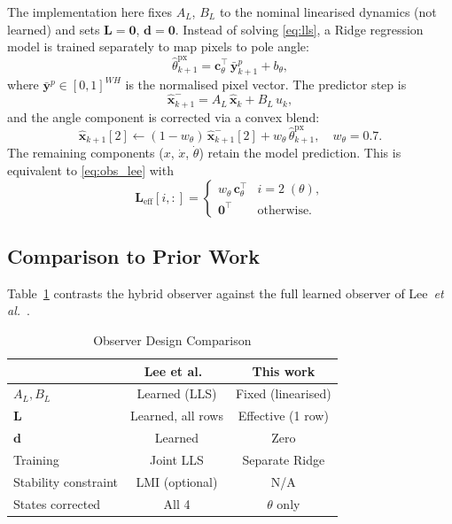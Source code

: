 \documentclass[conference]{IEEEtran}
\newcommand{\by}{\bm{y}}
\newcommand{\bxhat}{\hat{\bm{x}}}
\newcommand{\AL}{A_L}
\newcommand{\BL}{B_L}
\newcommand{\Lmat}{\bm{L}}
\begin{document}
The implementation here fixes $\AL$, $\BL$ to the nominal linearised dynamics
(not learned) and sets $\Lmat=\bm{0}$, $\bm{d}=\bm{0}$.  Instead of
solving \eqref{eq:lls}, a Ridge regression model is trained separately to map
pixels to pole angle:
\begin{equation}
  \hat\theta^{\mathrm{px}}_{k+1}
  = \bm{c}_\theta^\top\,\bar{\by}^p_{k+1} + b_\theta,
  \label{eq:ridge}
\end{equation}
where $\bar{\by}^p\in[0,1]^{WH}$ is the normalised pixel vector.  The
predictor step is
\begin{equation}
  \bxhat^-_{k+1} = \AL\,\bxhat_k + \BL\,u_k,
  \label{eq:predict}
\end{equation}
and the angle component is corrected via a convex blend:
\begin{equation}
  \bxhat_{k+1}[2] \leftarrow
  (1-w_\theta)\,\bxhat^-_{k+1}[2]
  + w_\theta\,\hat\theta^{\mathrm{px}}_{k+1},
  \quad w_\theta = 0.7.
  \label{eq:blend}
\end{equation}
The remaining components ($x$, $\dot x$, $\dot\theta$) retain the model
prediction.  This is equivalent to \eqref{eq:obs_lee} with
\begin{equation}
  \Lmat_{\mathrm{eff}}[i,:] = \begin{cases}
    w_\theta\,\bm{c}_\theta^\top & i=2\;(\theta), \\
    \bm{0}^\top & \text{otherwise.}
  \end{cases}
  \label{eq:Leff}
\end{equation}

\subsection{Comparison to Prior Work}

Table~\ref{tab:compare} contrasts the hybrid observer against the full
learned observer of Lee~\emph{et al.}~\cite{lee2024}.

\begin{table}[t]
  \centering
  \caption{Observer Design Comparison}
  \label{tab:compare}
  \renewcommand{\arraystretch}{1.15}
  \begin{tabular}{lcc}
    \toprule
     & Lee et al.~\cite{lee2024} & This work \\
    \midrule
    $\AL,\BL$ & Learned (LLS) & Fixed (linearised) \\
    $\Lmat$ & Learned, all rows & Effective (1 row) \\
    $\bm{d}$ & Learned & Zero \\
    Training & Joint LLS & Separate Ridge \\
    Stability constraint & LMI (optional) & N/A \\
    States corrected & All 4 & $\theta$ only \\
    \bottomrule
  \end{tabular}
\end{table}
\end{document}
